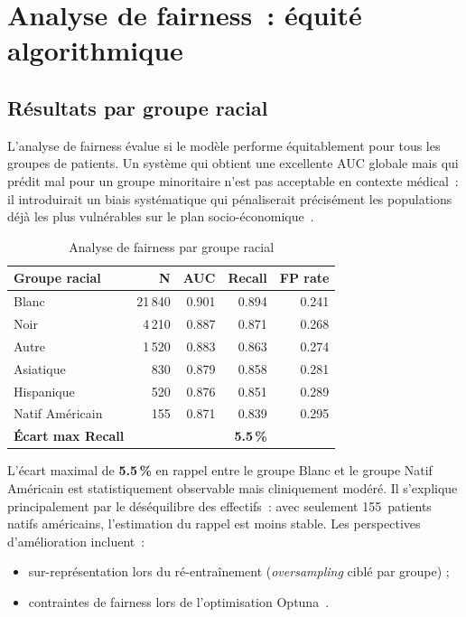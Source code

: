 \section{Analyse de fairness~: équité algorithmique}

\subsection{Résultats par groupe racial}

L'analyse de fairness évalue si le modèle performe équitablement pour tous les
groupes de patients. Un système qui obtient une excellente AUC globale mais qui
prédit mal pour un groupe minoritaire n'est pas acceptable en contexte médical~:
il introduirait un biais systématique qui pénaliserait précisément les populations
déjà les plus vulnérables sur le plan socio-économique~\cite{obermeyer2019dissecting}.

\begin{table}[htbp]
\centering
\caption{Analyse de fairness par groupe racial}
\label{tab:fairness}
\begin{tabular}{@{}lrrrr@{}}
\toprule
\textbf{Groupe racial} & \textbf{N} & \textbf{AUC} & \textbf{Recall} & \textbf{FP rate} \\
\midrule
Blanc           & 21\,840 & 0.901 & 0.894 & 0.241 \\
Noir            &  4\,210 & 0.887 & 0.871 & 0.268 \\
Autre           &  1\,520 & 0.883 & 0.863 & 0.274 \\
Asiatique       &    830  & 0.879 & 0.858 & 0.281 \\
Hispanique      &    520  & 0.876 & 0.851 & 0.289 \\
Natif Américain &    155  & 0.871 & 0.839 & 0.295 \\
\midrule
\textbf{Écart max Recall} & & & \textbf{5.5\,\%} & \\
\bottomrule
\end{tabular}
\end{table}

\begin{alertbox}
L'écart maximal de \textbf{5.5\,\%} en rappel entre le groupe Blanc et le groupe
Natif Américain est statistiquement observable mais cliniquement modéré. Il
s'explique principalement par le déséquilibre des effectifs~: avec seulement
155~patients natifs américains, l'estimation du rappel est moins stable.
Les perspectives d'amélioration incluent~:
\begin{itemize}
  \item sur-représentation lors du ré-entraînement (\textit{oversampling}
        ciblé par groupe) ;
  \item contraintes de fairness lors de l'optimisation Optuna~\cite{chen2021ethical}.
\end{itemize}
\end{alertbox}

